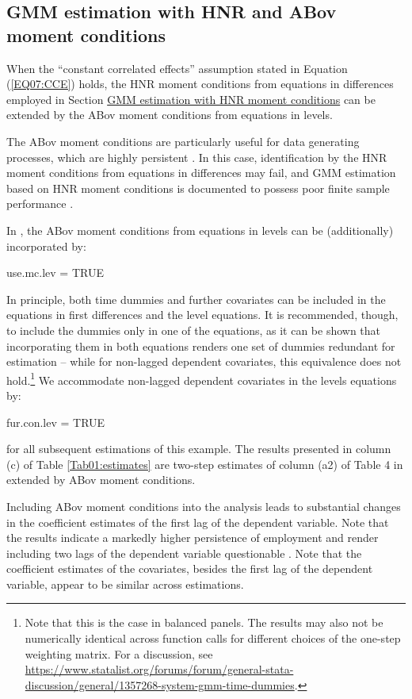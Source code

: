 \subsection{GMM estimation with HNR and ABov moment conditions} \label{sec:HNRABmcEstimation}
When the ``constant correlated effects'' assumption stated in Equation (\ref{EQ07:CCE}) holds, the HNR moment conditions from equations in differences employed in Section \hyperref[sec:HNRmcEstimation]{GMM estimation with HNR moment conditions} can be extended by the ABov moment conditions from equations in levels.

The ABov moment conditions are particularly useful for data generating processes, which are highly persistent \citep{BluBon1998}. In this case, identification by the HNR moment conditions from equations in differences may fail, and GMM estimation based on HNR moment conditions is documented to possess poor finite sample performance \citep[see, e.g.,][]{BluBon1998,BluBonWin2001,BunSar2015}.

In , the ABov moment conditions from equations in levels can be (additionally) incorporated by:
\begin{example}
use.mc.lev = TRUE
\end{example}
In principle, both time dummies and further covariates can be included in the equations in first differences and the level equations. It is recommended, though, to include the dummies only in one of the equations, as it can be shown that incorporating them in both equations renders one set of dummies redundant for estimation -- while for non-lagged dependent covariates, this equivalence does not hold.\footnote{Note that this is the case in balanced panels. The results may also not be numerically identical across function calls for different choices of the one-step weighting matrix. For a discussion, see \url{https://www.statalist.org/forums/forum/general-stata-discussion/general/1357268-system-gmm-time-dummies}.} We accommodate non-lagged dependent covariates in the levels equations by:
\begin{example}
fur.con.lev = TRUE
\end{example}
for all subsequent estimations of this example.
The results presented in column (c) of Table \ref{Tab01:estimates} are two-step estimates of column (a2) of Table 4 in \citet{AreBon1991} extended by ABov moment conditions.

Including ABov moment conditions into the analysis leads to substantial changes in the coefficient estimates of the first lag of the dependent variable. Note that the results indicate a markedly higher persistence of employment and render including two lags of the dependent variable questionable \citep[][e.g., estimate a version of the equation which contains only one lag of all covariates]{BluBon1998}. Note that the coefficient estimates of the covariates, besides the first lag of the dependent variable, appear to be similar across estimations.


